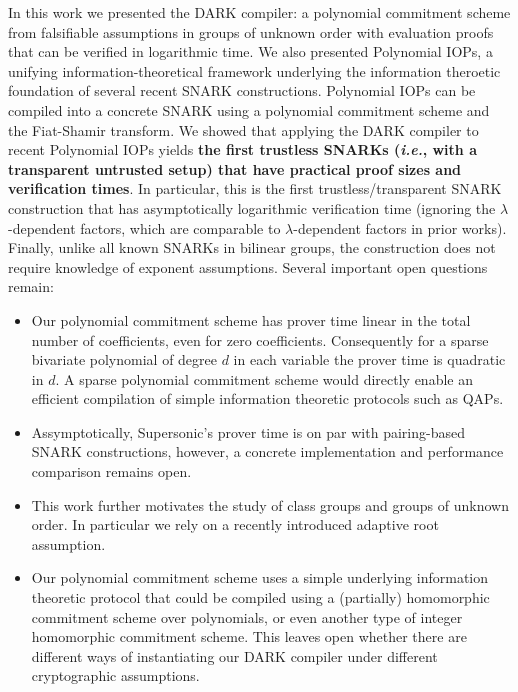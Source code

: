 In this work we presented the DARK compiler: a polynomial commitment scheme from falsifiable assumptions in groups of unknown order with evaluation proofs that can be verified in logarithmic time. We also presented Polynomial IOPs, a unifying information-theoretical framework underlying the information theroetic foundation of several recent SNARK constructions. Polynomial IOPs can be compiled into a concrete SNARK using a polynomial commitment scheme and the Fiat-Shamir transform. We showed that applying the DARK compiler to recent Polynomial IOPs yields \textbf{the first trustless SNARKs (\emph{i.e.}, with a transparent untrusted setup) that have practical proof sizes and verification times}. In particular, this is the first trustless/transparent SNARK construction that has asymptotically logarithmic verification time (ignoring the $\lambda$-dependent factors, which are comparable to $\lambda$-dependent factors in prior works). Finally, unlike all known SNARKs in bilinear groups, the construction does not require knowledge of exponent assumptions.
Several important open questions remain:

\begin{itemize}
    \item Our polynomial commitment scheme has prover time linear in the total number of coefficients, even for zero coefficients. Consequently for a sparse bivariate polynomial of degree $d$ in each variable the prover time is quadratic in $d$. A sparse polynomial commitment scheme would directly enable an efficient compilation of simple information theoretic protocols such as QAPs.
    \item Assymptotically, Supersonic's prover time is on par with pairing-based SNARK constructions, however, a concrete implementation and performance comparison remains open.
    \item This work further motivates the study of class groups and groups of unknown order. In particular we rely on a recently introduced adaptive root assumption.
    \item Our polynomial commitment scheme uses a simple underlying information theoretic protocol that could be compiled using a (partially) homomorphic commitment scheme over polynomials, or even another type of integer homomorphic commitment scheme. This leaves open whether there are different ways of instantiating our DARK compiler under different cryptographic assumptions. 
    
\end{itemize}


